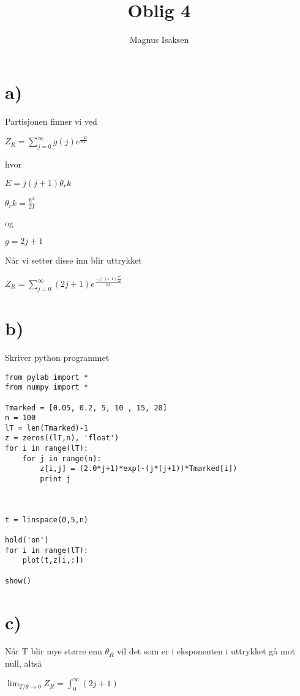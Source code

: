 \documentclass[12pt]{article}
\begin{document}
\title{Oblig 4}
\author{Magnus Isaksen}
\maketitle
\vfill
\newpage

\section*{a)}

Partisjonen finner vi ved 

$Z_R = \sum_{j=0}^{\infty} g(j)e^{\frac{-E}{kT}}$

hvor 

$E = j(j+1)\theta_rk$

$\theta_r k = \frac{\hbar^2}{2I}$

og 

$g = 2j+1$

Når vi setter disse inn blir uttrykket

$Z_R = \sum_{j=0}^{\infty} (2j+1)e^{\frac{-j(j+1)\frac{\hbar^2}{2I}}{kT}}$

\section*{b)}

Skriver python programmet 

\begin{lstlisting}
from pylab import *
from numpy import *

Tmarked = [0.05, 0.2, 5, 10 , 15, 20]
n = 100
lT = len(Tmarked)-1
z = zeros((lT,n), 'float')
for i in range(lT):
    for j in range(n):
        z[i,j] = (2.0*j+1)*exp(-(j*(j+1))*Tmarked[i])
        print j



t = linspace(0,5,n)

hold('on')
for i in range(lT):
    plot(t,z[i,:])

show()

\end{lstlisting}

\section*{c)}

Når T blir mye større enn $\theta_R$ vil det som er i eksponenten i uttrykket gå mot null, altså 

$\lim_{T/\theta \rightarrow 0} Z_R = \int_0^\infty (2j+1)$
\end{document}
